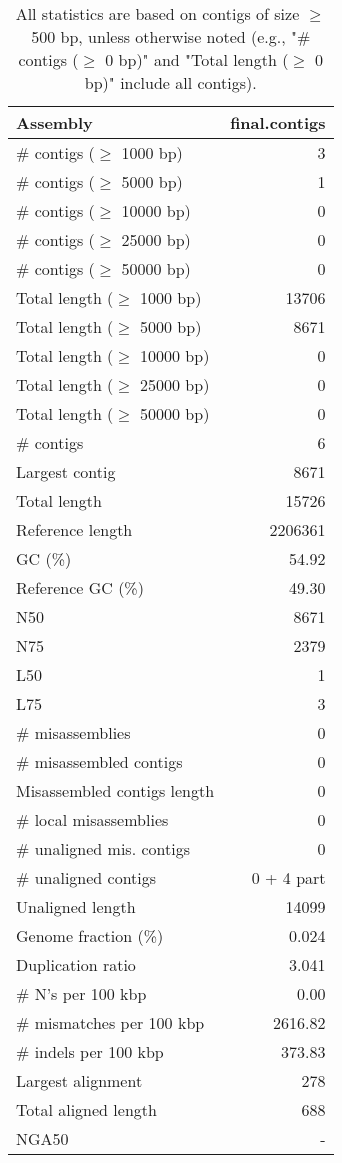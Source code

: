 \documentclass[12pt,a4paper]{article}
\begin{document}
\begin{table}[ht]
\begin{center}
\caption{All statistics are based on contigs of size $\geq$ 500 bp, unless otherwise noted (e.g., "\# contigs ($\geq$ 0 bp)" and "Total length ($\geq$ 0 bp)" include all contigs).}
\begin{tabular}{|l*{1}{|r}|}
\hline
Assembly & final.contigs \\ \hline
\# contigs ($\geq$ 1000 bp) & 3 \\ \hline
\# contigs ($\geq$ 5000 bp) & 1 \\ \hline
\# contigs ($\geq$ 10000 bp) & 0 \\ \hline
\# contigs ($\geq$ 25000 bp) & 0 \\ \hline
\# contigs ($\geq$ 50000 bp) & 0 \\ \hline
Total length ($\geq$ 1000 bp) & 13706 \\ \hline
Total length ($\geq$ 5000 bp) & 8671 \\ \hline
Total length ($\geq$ 10000 bp) & 0 \\ \hline
Total length ($\geq$ 25000 bp) & 0 \\ \hline
Total length ($\geq$ 50000 bp) & 0 \\ \hline
\# contigs & 6 \\ \hline
Largest contig & 8671 \\ \hline
Total length & 15726 \\ \hline
Reference length & 2206361 \\ \hline
GC (\%) & 54.92 \\ \hline
Reference GC (\%) & 49.30 \\ \hline
N50 & 8671 \\ \hline
N75 & 2379 \\ \hline
L50 & 1 \\ \hline
L75 & 3 \\ \hline
\# misassemblies & 0 \\ \hline
\# misassembled contigs & 0 \\ \hline
Misassembled contigs length & 0 \\ \hline
\# local misassemblies & 0 \\ \hline
\# unaligned mis. contigs & 0 \\ \hline
\# unaligned contigs & 0 + 4 part \\ \hline
Unaligned length & 14099 \\ \hline
Genome fraction (\%) & 0.024 \\ \hline
Duplication ratio & 3.041 \\ \hline
\# N's per 100 kbp & 0.00 \\ \hline
\# mismatches per 100 kbp & 2616.82 \\ \hline
\# indels per 100 kbp & 373.83 \\ \hline
Largest alignment & 278 \\ \hline
Total aligned length & 688 \\ \hline
NGA50 & - \\ \hline
\end{tabular}
\end{center}
\end{table}
\end{document}
